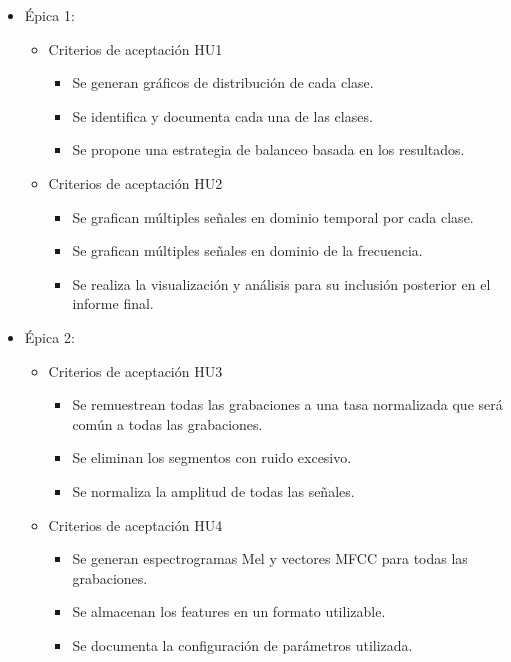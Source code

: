 \documentclass[
11pt, %
]{charter}
\begin{document}
\begin{itemize}
  \item Épica 1:
    \begin{itemize}
      \item Criterios de aceptación HU1
        \begin{itemize}
          \item Se generan gráficos de distribución de cada clase.
          \item Se identifica y documenta cada una de las clases.
          \item Se propone una estrategia de balanceo basada en los resultados.
        \end{itemize}
      \item Criterios de aceptación HU2
        \begin{itemize}
          \item Se grafican múltiples señales en dominio temporal por cada clase.
          \item Se grafican múltiples señales en dominio de la frecuencia.
          \item Se realiza la visualización y análisis para su inclusión posterior en el
          informe final.
        \end{itemize}
    \end{itemize}
  \item Épica 2:
    \begin{itemize}
      \item Criterios de aceptación HU3
        \begin{itemize}
          \item Se remuestrean todas las grabaciones a una tasa normalizada que será común a todas las grabaciones.
          \item Se eliminan los segmentos con ruido excesivo.
          \item Se normaliza la amplitud de todas las señales.
        \end{itemize}
      \item Criterios de aceptación HU4
        \begin{itemize}
          \item Se generan espectrogramas Mel y vectores MFCC para todas las grabaciones.
          \item Se almacenan los features en un formato utilizable.
          \item Se documenta la configuración de parámetros utilizada.
        \end{itemize}

\end{itemize}
\end{itemize}
\end{document}

